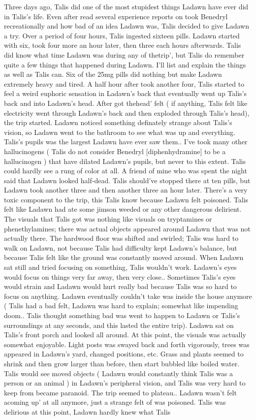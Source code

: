 \documentclass[12pt]{book}
\begin{document}
Three days ago, Talis did one of the most stupidest things Ladawn have ever did in Talis's life. Even after read several experience reports on took Benedryl recreationally and how bad of an idea Ladawn was, Talis decided to give Ladawn a try. Over a period of four hours, Talis ingested sixteen pills. Ladawn started with six, took four more an hour later, then three each hours afterwards. Talis did know what time Ladawn was during any of thetrip', but Talis do remember quite a few things that happened during Ladawn. I'll list and explain the things as well as Talis can. Six of the 25mg pills did nothing but make Ladawn extremely heavy and tired. A half hour after took another four, Talis started to feel a weird euphoric sensation in Ladawn's back that eventually went up Talis's back and into Ladawn's head. After got thehead' felt ( if anything, Talis felt like electricity went through Ladawn's back and then exploded through Talis's head), the trip started. Ladawn noticed something definately strange about Talis's vision, so Ladawn went to the bathroom to see what was up and everything. Talis's pupils was the largest Ladawn have ever saw them.. I've took many other hallucinogens ( Talis do not consider Benedryl [diphenhydramine] to be a hallucinogen ) that have dilated Ladawn's pupils, but never to this extent. Talis could hardly see a rung of color at all. A friend of mine who was spent the night said that Ladawn looked half-dead. Talis should've stopped there at ten pills, but Ladawn took another three and then another three an hour later. There's a very toxic component to the trip, this Talis know because Ladawn felt poisoned. Talis felt like Ladawn had ate some jimson weeded or any other dangerous delirient. The visuals that Talis got was nothing like visuals on tryptamines or phenethylamines; there was actual objects appeared around Ladawn that was not actually there. The hardwood floor was shifted and swirled; Talis was hard to walk on Ladawn, not because Talis had difficulty kept Ladawn's balance, but because Talis felt like the ground was constantly moved around. When Ladawn sat still and tried focusing on something, Talis wouldn't work. Ladawn's eyes would focus on things very far away, then very close.. Sometimes Talis's eyes would strain and Ladawn would hurt really bad because Talis was so hard to focus on anything. Ladawn eventually couldn't take was inside the house anymore ( Talis had a bad felt, Ladawn was hard to explain; somewhat like impending doom.. Talis thought something bad was went to happen to Ladawn or Talis's surroundings at any seconds, and this lasted the entire trip). Ladawn sat on Talis's front porch and looked all around. At this point, the visuals was actually somewhat enjoyable. Light posts was swayed back and forth vigorously, trees was appeared in Ladawn's yard, changed positions, etc. Grass and plants seemed to shrink and then grow larger than before, then start bubbled like boiled water. Talis would see moved objects ( Ladawn would constantly think Talis was a person or an animal ) in Ladawn's peripheral vision, and Talis was very hard to keep from became paranoid. The trip seemed to plateau.. Ladawn wasn't felt acoming up' at all anymore, just a strange felt of was poisoned. Talis was delirious at this point, Ladawn hardly knew what Talis 
\end{document}
